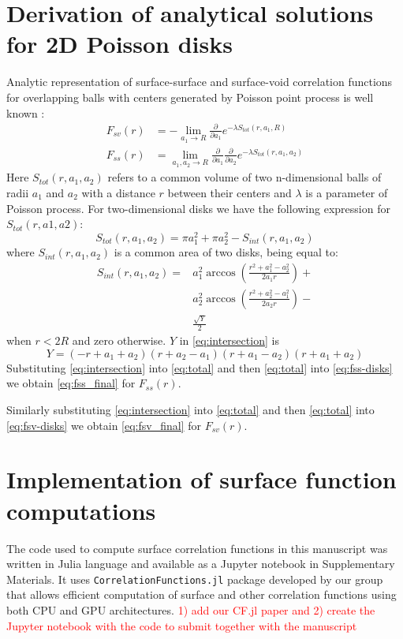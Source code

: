 \documentclass[reprint,amsmath,amssymb,aps,pre,showkeys,showpacs]{revtex4-1}
\newcommand{\code}[1]{\colorbox{light-gray}{\texttt{#1}}}
\begin{document}
\section{Derivation of analytical solutions for 2D Poisson disks}
\label{ap:overlapping-disks}
Analytic representation of surface-surface and surface-void correlation
functions for overlapping balls with centers generated by Poisson point process
is well known \cite{Torquato_book}:
\begin{align}
  F_{sv}(r) &= -\lim_{a_1 \rightarrow R} \frac{\partial}{\partial a_1}
  e^{-\lambda S_{tot}(r, a_1, R)} \label{eq:fsv-disks} \\
  F_{ss}(r) &= \lim_{a_1, a_2 \rightarrow R} \frac{\partial}{\partial a_1}
  \frac{\partial}{\partial a_2} e^{-\lambda S_{tot}(r, a_1,
    a_2)} \label{eq:fss-disks}
\end{align}
Here $S_{tot}(r, a_1, a_2)$ refers to a common volume of two n-dimensional balls
of radii $a_1$ and $a_2$ with a distance $r$ between their centers and $\lambda$
is a parameter of Poisson process. For two-dimensional disks we have the
following expression for $S_{tot}(r, a1, a2)$:
\begin{equation}
  S_{tot}(r, a_1, a_2) = \pi a_1^2 + \pi a_2^2 - S_{int}(r, a_1, a_2) \label{eq:total}
\end{equation}
where $S_{int}(r, a_1, a_2)$ is a common area of two disks, being equal to:
\begin{align}
  S_{int}(r, a_1, a_2) =&  a_1^2 \arccos(\frac{r^2+a_1^2-a_2^2}{2a_1r}) + \\
  & a_2^2 \arccos(\frac{r^2+a_2^2-a_1^2}{2a_2r}) - \\
  & \frac{\sqrt{Y}}{2} \label{eq:intersection}
\end{align}
when $r<2R$ and zero otherwise. $Y$ in \cref{eq:intersection} is
\begin{equation*}
  Y = (-r+a_1+a_2)(r+a_2-a_1)(r+a_1-a_2)(r+a_1+a_2)
\end{equation*}
Substituting \cref{eq:intersection} into \cref{eq:total} and then
\cref{eq:total} into \cref{eq:fss-disks} we obtain \cref{eq:fss_final} for
$F_{ss}(r)$.

Similarly substituting \cref{eq:intersection} into \cref{eq:total} and then
\cref{eq:total} into \cref{eq:fsv-disks} we obtain \cref{eq:fsv_final} for
$F_{sv}(r)$.

\section{Implementation of surface function computations}
\label{ap:b_code}
The code used to compute surface correlation functions in this manuscript was
written in Julia language and available as a Jupyter notebook in Supplementary
Materials. It uses \code{CorrelationFunctions.jl} package developed by our group
\cite{CFsjlpaper} that allows efficient computation of surface and other
correlation functions using both CPU and GPU architectures. \textcolor{red}{1)
  add our CF.jl paper and 2) create the Jupyter notebook with the code to submit
  together with the manuscript}


\end{document}

